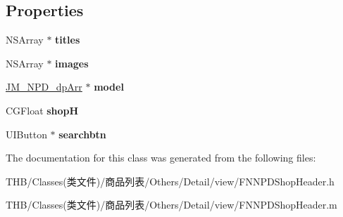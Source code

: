 \subsection*{Properties}
\begin{DoxyCompactItemize}
\item 
\mbox{\label{interface_f_n_n_p_d_shop_header_af8a6696b0282a38595581a5c374e6ebc}} 
N\+S\+Array $\ast$ {\bfseries titles}
\item 
\mbox{\label{interface_f_n_n_p_d_shop_header_ab081d23cca1ca3584db9f9e22c824f72}} 
N\+S\+Array $\ast$ {\bfseries images}
\item 
\mbox{\label{interface_f_n_n_p_d_shop_header_afb1a0d10506677de64cdb0d52d11f49d}} 
\mbox{\hyperlink{interface_j_m___n_p_d__dp_arr}{J\+M\+\_\+\+N\+P\+D\+\_\+dp\+Arr}} $\ast$ {\bfseries model}
\item 
\mbox{\label{interface_f_n_n_p_d_shop_header_a9b4382279f792af235f6ec0b6aa9286e}} 
C\+G\+Float {\bfseries shopH}
\item 
\mbox{\label{interface_f_n_n_p_d_shop_header_a5acc7008801bf7e8b7fe6ce3b07a7bec}} 
U\+I\+Button $\ast$ {\bfseries searchbtn}
\end{DoxyCompactItemize}


The documentation for this class was generated from the following files\+:\begin{DoxyCompactItemize}
\item 
T\+H\+B/\+Classes(类文件)/商品列表/\+Others/\+Detail/view/F\+N\+N\+P\+D\+Shop\+Header.\+h\item 
T\+H\+B/\+Classes(类文件)/商品列表/\+Others/\+Detail/view/F\+N\+N\+P\+D\+Shop\+Header.\+m\end{DoxyCompactItemize}
